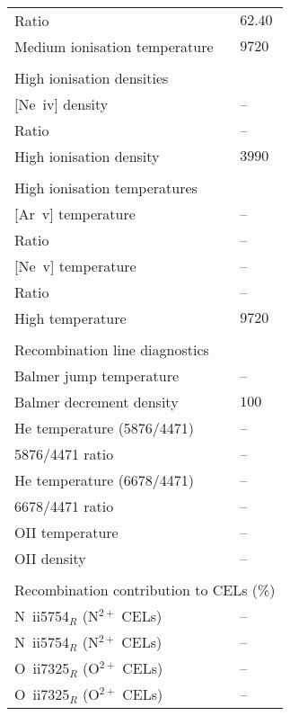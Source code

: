 \begin{longtable}[l]{ll}
 Ratio                               & $ 62.40$\\
 Medium ionisation temperature       & $ 9720$\\
 \vspace{0.2cm}\\\multicolumn{2}{l}{High ionisation densities}\\ \hline
 {}[Ne~{\sc iv}] density             & -- \\
 Ratio                               & -- \\
 High ionisation density             & $ 3990$\\
 \vspace{0.2cm}\\\multicolumn{2}{l}{High ionisation temperatures}\\ \hline
 {}[Ar~{\sc v}] temperature          & -- \\
 Ratio                               & -- \\
 {}[Ne~{\sc v}] temperature          & -- \\
 Ratio                               & -- \\
 High temperature                    & $ 9720$\\
 \vspace{0.2cm}\\\multicolumn{2}{l}{Recombination line diagnostics}\\ \hline
 Balmer jump temperature             & -- \\
 Balmer decrement density            & $  100$\\
 He temperature (5876/4471)          & -- \\
 5876/4471 ratio                     & -- \\
 He temperature (6678/4471)          & -- \\
 6678/4471 ratio                     & -- \\
 OII temperature                     & -- \\
 OII density                         & -- \\
 \vspace{0.2cm}\\\multicolumn{2}{l}{Recombination contribution to CELs (\%)}\\ \hline
 N~{\sc ii}5754$_R$ (N$^{2+}$ CELs)  & -- \\
 N~{\sc ii}5754$_R$ (N$^{2+}$ CELs)  & -- \\
 O~{\sc ii}7325$_R$ (O$^{2+}$ CELs)  & -- \\
 O~{\sc ii}7325$_R$ (O$^{2+}$ CELs)  & -- \\

\end{longtable}
